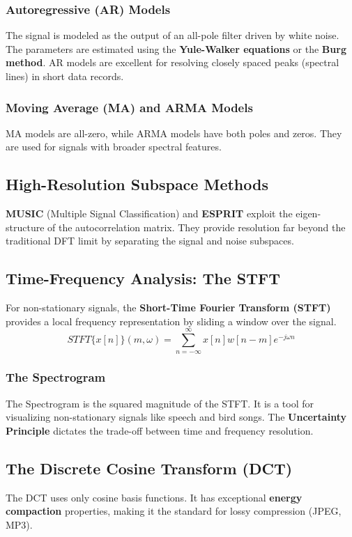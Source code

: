 \subsubsection{Autoregressive (AR) Models}
The signal is modeled as the output of an all-pole filter driven by white noise. The parameters are estimated using the \textbf{Yule-Walker equations} or the \textbf{Burg method}. AR models are excellent for resolving closely spaced peaks (spectral lines) in short data records.

\subsubsection{Moving Average (MA) and ARMA Models}
MA models are all-zero, while ARMA models have both poles and zeros. They are used for signals with broader spectral features.

\subsection{High-Resolution Subspace Methods}
\textbf{MUSIC} (Multiple Signal Classification) and \textbf{ESPRIT} exploit the eigen-structure of the autocorrelation matrix. They provide resolution far beyond the traditional DFT limit by separating the signal and noise subspaces.

\subsection{Time-Frequency Analysis: The STFT}
For non-stationary signals, the \textbf{Short-Time Fourier Transform (STFT)} provides a local frequency representation by sliding a window over the signal.
\begin{equation}
    STFT\{x[n]\}(m, \omega) = \sum_{n=-\infty}^{\infty} x[n]w[n-m]e^{-j\omega n}
\end{equation}

\subsubsection{The Spectrogram}
The Spectrogram is the squared magnitude of the STFT. It is a tool for visualizing non-stationary signals like speech and bird songs. The \textbf{Uncertainty Principle} dictates the trade-off between time and frequency resolution.

\subsection{The Discrete Cosine Transform (DCT)}
The DCT uses only cosine basis functions. It has exceptional \textbf{energy compaction} properties, making it the standard for lossy compression (JPEG, MP3).

